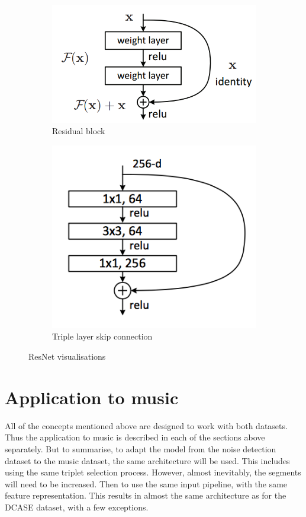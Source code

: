 \begin{figure}[htb]
\centering
\begin{subfigure}{.5\linewidth}
  \centering
  \includegraphics[width=\linewidth]{img/ResNet_SkipConnections.png}
  \caption{Residual block}
  \label{fig:ResNet-Residual-Block}
\end{subfigure}%
\begin{subfigure}{.5\linewidth}
  \centering
  \includegraphics[width=.75\linewidth]{img/ResNet_Stacks.png}
  \caption{Triple layer skip connection}
  \label{fig:ResNet-Skip-Layers}
\end{subfigure}
\caption[ResNet visualisations]{ResNet visualisations\footnotemark}
\label{fig:ResNet-Visualisations}
\end{figure}

\section{Application to music}
\label{sec:Application-Music}
All of the concepts mentioned above are designed to work with both datasets. Thus the application to music is described in each of the sections above separately. But to summarise, to adapt the model from the noise detection dataset to the music dataset, the same architecture will be used. This includes using the same triplet selection process. However, almost inevitably, the segments will need to be increased. Then to use the same input pipeline, with the same feature representation. This results in almost the same architecture as for the \gls{DCASE} dataset, with a few exceptions.

